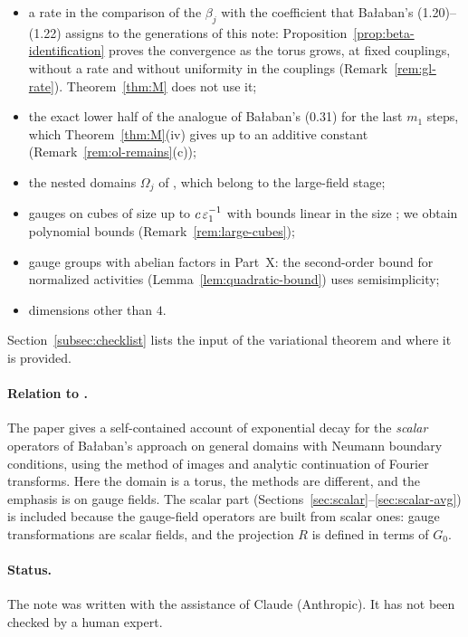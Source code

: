 \begin{itemize}
\item a rate in the comparison of the $\beta_j$ with the coefficient that Ba\l aban's (1.20)--(1.22) assigns to the generations of this note: Proposition~\ref{prop:beta-identification} proves the convergence as the torus grows, at fixed couplings, without a rate and without uniformity in the couplings (Remark~\ref{rem:gl-rate}). Theorem~\ref{thm:M} does not use it;
\item the exact lower half of the analogue of Ba\l aban's (0.31) for the last $m_1$ steps, which Theorem~\ref{thm:M}(iv) gives up to an additive constant (Remark~\ref{rem:ol-remains}(c));
\item the nested domains $\Omega_j$ of \cite{BalVar}, which belong to the large-field stage;
\item gauges on cubes of size up to $c\,\varepsilon_1^{-1}$ with bounds linear in the size \cite[(9), (10)]{BalVar}; we obtain polynomial bounds (Remark~\ref{rem:large-cubes});
\item gauge groups with abelian factors in Part~X: the second-order bound for normalized activities (Lemma~\ref{lem:quadratic-bound}) uses semisimplicity;
\item dimensions other than $4$.
\end{itemize}
Section~\ref{subsec:checklist} lists the input of the variational theorem and where it is provided.

\paragraph{Relation to \cite{DST1}.} The paper \cite{DST1} gives a self-contained account of exponential decay for the \emph{scalar} operators of Ba\l aban's approach on general domains with Neumann boundary conditions, using the method of images and analytic continuation of Fourier transforms. Here the domain is a torus, the methods are different, and the emphasis is on gauge fields. The scalar part (Sections~\ref{sec:scalar}--\ref{sec:scalar-avg}) is included because the gauge-field operators are built from scalar ones: gauge transformations are scalar fields, and the projection $R$ is defined in terms of $G_0$.

\paragraph{Status.} The note was written with the assistance of Claude (Anthropic). It has not been checked by a human expert.
